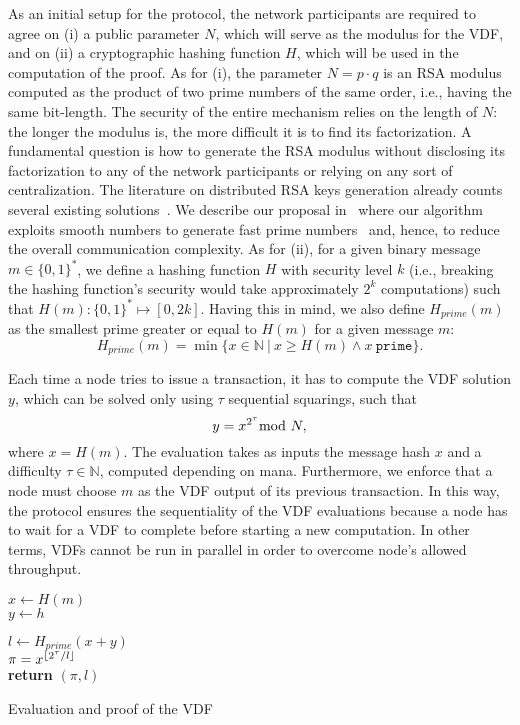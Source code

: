 \documentclass[../main.tex]{subfiles}
\begin{document}
As an initial setup for the protocol, the network participants are required to agree on (i) a public parameter $N$, which will serve as the modulus for the VDF, and on (ii) a cryptographic hashing function $H$, which will be used in the computation of the proof. As for (i), the parameter $N=p\cdot q$ is an RSA modulus computed as the product of two prime numbers of the same order, i.e., having the same bit-length. The security of the entire mechanism relies on the length of $N$: the longer the modulus is, the more difficult it is to find its factorization. A fundamental question is how to generate the RSA modulus without disclosing its factorization to any of the network participants or relying on any sort of centralization. The literature on distributed RSA keys generation already counts several existing solutions~\cite{Boneh1997, Damgard2010, Hazay, Frederiksen}. We describe our proposal in~\cite{attias2019} where our algorithm exploits smooth numbers to generate fast prime numbers~\cite{dimitrov2019} and, hence, to reduce the overall communication complexity. As for (ii), for a given binary message $m\in\{0,1\}^*$, we define a hashing function $H$ with security level $k$ (i.e., breaking the hashing function's security would take approximately $2^k$ computations) such that $H(m): \{0,1\}^* \mapsto [0,2k]$. Having this in mind, we also define $H_{prime}(m)$ as the smallest prime greater or equal to $H(m)$ for a given message $m$:
    \begin{equation*}
        H_{prime}(m) = \min\{x \in\mathbb{N} \ | \ x \geq H(m) \wedge x \ \texttt{prime}\}.
    \end{equation*}

Each time a node tries to issue a transaction, it has to compute the VDF solution $y$, which can be solved only using $\tau$ sequential squarings, such that
\begin{equation}\label{eq:eval}
    y = x^{2^\tau} \mathrm{mod}\  N,
\end{equation}
where $x = H(m)$. The evaluation takes as inputs the message hash $x$ and a difficulty $\tau\in\mathbb{N}$, computed depending on mana. Furthermore, we enforce that a node must choose $m$ as the VDF output of its previous transaction. In this way, the protocol ensures the sequentiality of the VDF evaluations because a node has to wait for a VDF to complete before starting a new computation. In other terms, VDFs cannot be run in parallel in order to overcome node's allowed throughput.

\begin{algorithm}[ht]
\SetAlgoLined
{}

 $x\leftarrow H(m)$\\
 $y\leftarrow h$\\
 
 $l\leftarrow H_{prime}(x+y)$\\
 $\pi=x^{\lfloor2^\tau/l\rfloor}$\\
 \textbf{return} $(\pi,l)$
 \caption{Evaluation and proof of the VDF}\label{alg:eval_proof}
\end{algorithm}
\end{document}
